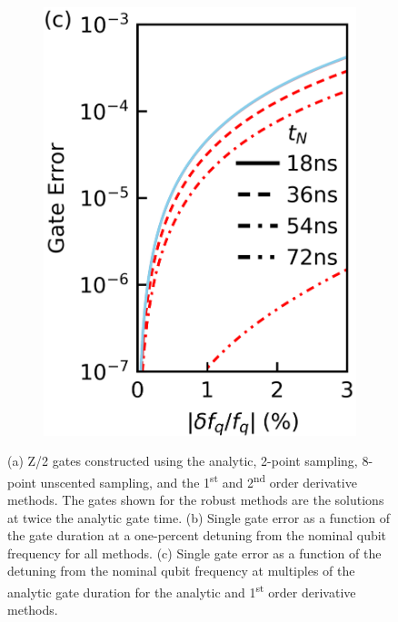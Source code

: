 \documentclass[
  amsfonts,
  amsmath,
  tbtags,
  amssymb,
  aps,
  nobibnotes,
  twocolumn,
  superscriptaddress,
]{revtex4-2}
\begin{document}
\begin{figure}[ht]
  \begin{subfigure}{.23\textwidth}
    \includegraphics[width=\linewidth]{assets/f2b.png}
  \end{subfigure}
  
  \caption{
    (a) Z/2 gates constructed using the
    analytic, 2-point sampling, 8-point unscented sampling, and the 1\textsuperscript{st}
    and 2\textsuperscript{nd} order derivative methods. The gates
    shown for the robust methods are the solutions at twice the analytic
    gate time.
    (b) Single gate error as
    a function of the gate duration at a one-percent
    detuning from the nominal qubit frequency for all methods.
    (c) Single gate error as a function of the detuning from the nominal
    qubit frequency at multiples of the analytic gate duration for the analytic
    and 1\textsuperscript{st} order derivative methods.
  }
\end{figure}
\end{document}
